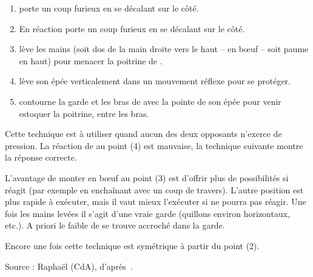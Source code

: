 \begin{technique}

\begin{enumerate}
	\item \A porte un coup furieux en se décalant sur le côté.
	
	\item En réaction \D porte un coup furieux en se décalant sur le côté.
	
	\item \D lève les mains (soit dos de la main droite vers le haut – en bœuf – soit paume en haut) pour menacer la poitrine de \A.
	
	\item \A lève son épée verticalement dans un mouvement réflexe pour se protéger.
	
	\item \D contourne la garde et les bras de \A avec la pointe de son épée pour venir estoquer la poitrine, entre les bras.
\end{enumerate}

Cette technique est à utiliser quand aucun des deux opposants n'exerce de pression.
La réaction de \A au point (4) est mauvaise, la technique suivante montre la réponse correcte.

L'avantage de monter en bœuf au point (3) est d'offrir plus de possibilités si \A réagit (par exemple en enchaînant avec un coup de travers).
L'autre position est plus rapide à exécuter, mais il vaut mieux l'exécuter si \A ne pourra pas réagir.
Une fois les mains levées il s'agit d'une vraie garde (quillons environ horizontaux, etc.).
A priori le faible de \A se trouve accroché dans la garde.

Encore une fois cette technique est symétrique à partir du point (2).

Source : Raphaël (CdA), d'après~\cite[fol.~19r-20v, §3–4, pp.~16–17]{farrell:ringeck}.
\end{technique}


